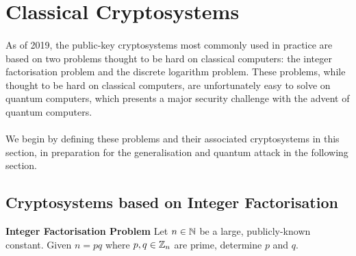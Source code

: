 \section{Classical Cryptosystems}
\paragraph{}
As of 2019, the public-key cryptosystems most commonly used in practice are based on two problems thought to be hard on classical computers: the integer factorisation problem and the discrete logarithm problem. These problems, while thought to be hard on classical computers, are unfortunately easy to solve on quantum computers, which presents a major security challenge with the advent of quantum computers.

\paragraph{}
We begin by defining these problems and their associated cryptosystems in this section, in preparation for the generalisation and quantum attack in the following section.

\subsection{Cryptosystems based on Integer Factorisation}
\theoremstyle{definition}
\begin{definition}{\textbf{Integer Factorisation Problem}}
Let $n \in \mathbb{N}$ be a large, publicly-known constant. Given $n = pq$ where $p,q \in \mathbb{Z}_n$ are prime, determine $p$ and $q$.
\end{definition}

